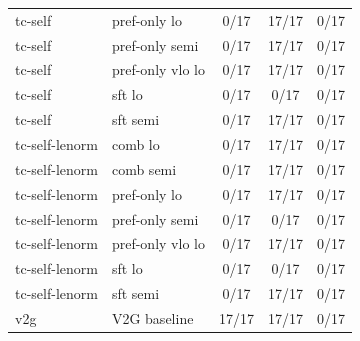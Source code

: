 \documentclass[10pt,landscape]{article}
\begin{document}
\begin{tabular}{llccc}
tc-self & pref-only lo & \cellcolor{missing}0/17 & \cellcolor{done}17/17 & \cellcolor{missing}0/17 \\
tc-self & pref-only semi & \cellcolor{missing}0/17 & \cellcolor{done}17/17 & \cellcolor{missing}0/17 \\
tc-self & pref-only vlo lo & \cellcolor{missing}0/17 & \cellcolor{done}17/17 & \cellcolor{missing}0/17 \\
tc-self & sft lo & \cellcolor{missing}0/17 & \cellcolor{missing}0/17 & \cellcolor{missing}0/17 \\
tc-self & sft semi & \cellcolor{missing}0/17 & \cellcolor{done}17/17 & \cellcolor{missing}0/17 \\
tc-self-lenorm & comb lo & \cellcolor{missing}0/17 & \cellcolor{done}17/17 & \cellcolor{missing}0/17 \\
tc-self-lenorm & comb semi & \cellcolor{missing}0/17 & \cellcolor{done}17/17 & \cellcolor{missing}0/17 \\
tc-self-lenorm & pref-only lo & \cellcolor{missing}0/17 & \cellcolor{done}17/17 & \cellcolor{missing}0/17 \\
tc-self-lenorm & pref-only semi & \cellcolor{missing}0/17 & \cellcolor{missing}0/17 & \cellcolor{missing}0/17 \\
tc-self-lenorm & pref-only vlo lo & \cellcolor{missing}0/17 & \cellcolor{done}17/17 & \cellcolor{missing}0/17 \\
tc-self-lenorm & sft lo & \cellcolor{missing}0/17 & \cellcolor{missing}0/17 & \cellcolor{missing}0/17 \\
tc-self-lenorm & sft semi & \cellcolor{missing}0/17 & \cellcolor{done}17/17 & \cellcolor{missing}0/17 \\
v2g & V2G baseline & \cellcolor{done}17/17 & \cellcolor{done}17/17 & \cellcolor{missing}0/17 \\
\bottomrule
\end{tabular}
\vspace{1em}
\end{document}
